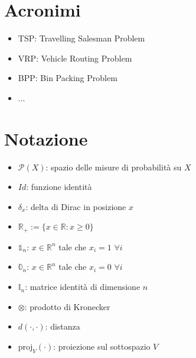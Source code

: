 \appendix
\chapter{Acronimi}
\begin{itemize}
\item TSP: Travelling Salesman Problem 
\item VRP: Vehicle Routing Problem 
\item BPP: Bin Packing Problem
\item ...
\end{itemize}





\chapter{Notazione}
\begin{itemize}
	\item $\mathcal{P}(X)$: spazio delle misure di probabilità su $X$
	\item $Id$: funzione identità
	\item $\delta_{x}$: delta di Dirac in posizione $x$
	\item $\mathbb{R}_{+} := \{x \in \mathbb{R} : x \ge 0\}$
	\item $\mathbb{1}_n$: $x \in \mathbb{R}^n$ tale che $x_i=1$ $\forall i$
	\item $\mathbb{0}_n$: $x \in \mathbb{R}^n$ tale che $x_i=0$ $\forall i$ 

	\item $\mathbb{I}_n$: matrice identità di dimensione $n$
	\item $\otimes$: prodotto di Kronecker
	\item $d( \cdot, \cdot)$: distanza
	\item $\mbox{proj}_V(\cdot)$: proiezione sul sottospazio $V$
\end{itemize}












